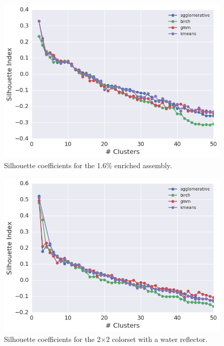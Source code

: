 \begin{figure}[h!]
\centering
\includegraphics[width=0.87\linewidth]{figures/results/model-select/assm-16/silhouette-combined-U238-capture-1}
\vspace{2mm}
\caption[Silhouette coefficients for the 1.6\% enriched assembly]{Silhouette coefficients for the 1.6\% enriched assembly.}
\label{fig:chap11-assm-16-silhouette-coeff}
\end{figure}

\begin{figure}[h!]
\centering
\includegraphics[width=0.87\linewidth]{figures/results/model-select/reflector/silhouette-combined-U238-nu-fission-1}
\vspace{2mm}
\caption[Silhouette coefficients for the 2$\times$2 colorset with reflector]{Silhouette coefficients for the 2$\times$2 colorset with a water reflector.}
\label{fig:chap11-refl-silhouette-coeff}
\end{figure}


